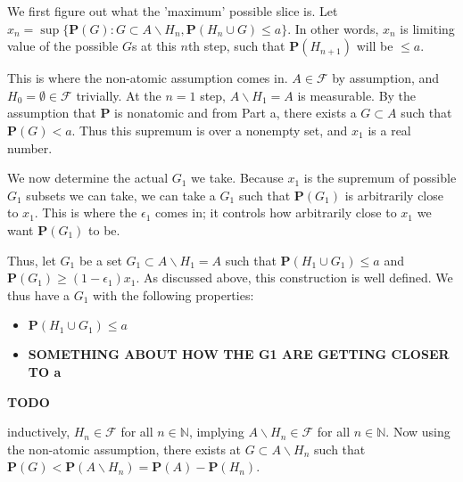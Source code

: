 \documentclass{article}
\newcommand{\F}{\mathcal{F}}
\newcommand{\prob}{\boldsymbol{P}}
\newcommand{\N}{\mathbb{N}}
\begin{document}
We first figure out what the 'maximum' possible slice is. Let $x_n = \sup\{\prob(G): G \subset A\backslash H_n, \prob(H_n \cup G) \leq a\}$. In other words, $x_n$ is limiting value of the possible $G$s at this $n$th step, such that $\prob(H_{n+1})$ will be $\leq a$.

This is where the non-atomic assumption comes in. $A \in \F$ by assumption, and $H_0 = \emptyset \in \F$ trivially. At the $n=1$ step, $A \backslash H_1 = A$ is measurable. By the assumption that $\prob$ is nonatomic and from Part a, there exists a $G \subset A$ such that $\prob(G) < a$. Thus this supremum is over a nonempty set, and $x_1$ is a real number.

We now determine the actual $G_1$ we take. Because $x_1$ is the supremum of possible $G_1$ subsets we can take, we can take a $G_1$ such that $\prob(G_1)$ is arbitrarily close to $x_1$. This is where the $\epsilon_1$ comes in; it controls how arbitrarily close to $x_1$ we want $\prob(G_1)$ to be.

Thus, let $G_1$ be a set $G_1 \subset A\backslash H_1 = A$ such that $\prob(H_1 \cup G_1) \leq a$ and $\prob(G_1) \geq (1-\epsilon_1)x_1$. As discussed above, this construction is well defined. We thus have a $G_1$ with the following properties:

\begin{itemize}
\item $\prob(H_1 \cup G_1) \leq a$
\item \textbf{SOMETHING ABOUT HOW THE G1 ARE GETTING CLOSER TO a}
\end{itemize}

\textbf{TODO}

inductively, $H_n \in \F$ for all $n \in \N$, implying $A\backslash H_n \in \F$ for all $n \in \N$. Now using the non-atomic assumption, there exists at $G \subset A\backslash H_n$ such that $\prob(G) < \prob(A\backslash H_n) = \prob(A) - \prob(H_n)$.
\end{document}
